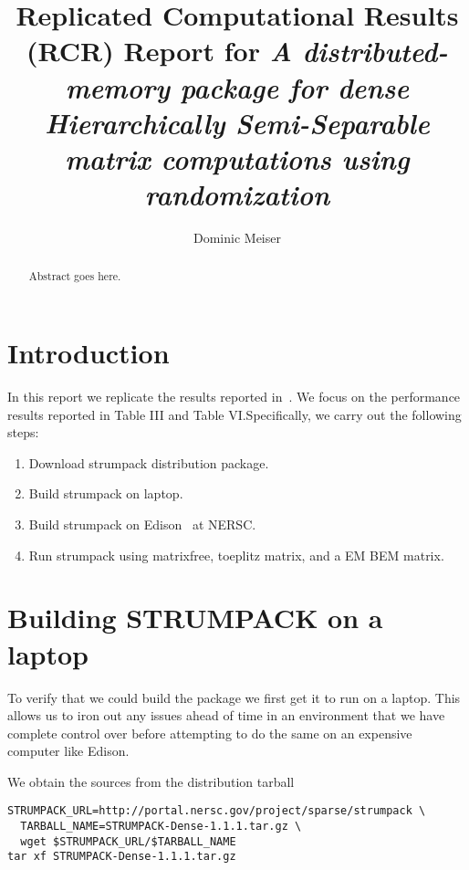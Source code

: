 \documentclass{acmsmall}
\begin{document}
\title{Replicated Computational Results (RCR) Report for
  \textit{A distributed-memory package for dense Hierarchically
    Semi-Separable matrix computations using randomization}}

\author{Dominic Meiser
}


\begin{abstract}
Abstract goes here.
\end{abstract}

\maketitle 

\section{Introduction}

In this report we replicate the results reported
in~\cite{strumpackpaper}.  We focus on the performance results
reported in Table III and Table VI.\@  Specifically, we carry out
the following steps:

\begin{enumerate}
  \item Download strumpack distribution package.
  \item Build strumpack on laptop.
  \item Build strumpack on Edison~\cite{Edison} at NERSC.
  \item Run strumpack using matrixfree, toeplitz matrix, and a EM
    BEM matrix.
\end{enumerate}


\section{Building STRUMPACK on a laptop}

To verify that we could build the package we first get it to run
on a laptop.  This allows us to iron out any issues ahead of time
in an environment that we have complete control over before
attempting to do the same on an expensive computer like Edison.

We obtain the sources from the distribution tarball
\begin{verbatim}
STRUMPACK_URL=http://portal.nersc.gov/project/sparse/strumpack \
  TARBALL_NAME=STRUMPACK-Dense-1.1.1.tar.gz \
  wget $STRUMPACK_URL/$TARBALL_NAME
tar xf STRUMPACK-Dense-1.1.1.tar.gz
\end{verbatim}
\end{document}
